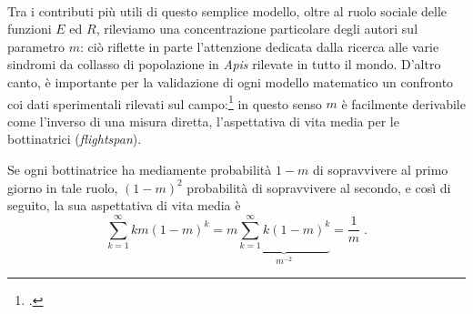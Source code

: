 \paragraph{}
\label{par:mInverseFlightspan}
Tra i contributi più utili di questo semplice modello, oltre al ruolo sociale delle funzioni $E$ ed
$R$, rileviamo una concentrazione particolare degli autori sul parametro $m$:
ciò riflette in parte l'attenzione dedicata dalla ricerca alle varie sindromi da
collasso di popolazione in \emph{Apis} rilevate in tutto il mondo.
D'altro canto, è importante per la validazione di ogni modello matematico
un confronto coi dati sperimentali rilevati sul campo:\footcite{rueppell2009honey}
in questo senso $m$ è facilmente derivabile come l'inverso
di una misura diretta, l'aspettativa di vita media per le bottinatrici (\emph{flightspan}).

Se ogni bottinatrice ha mediamente probabilità $1-m$ di sopravvivere al primo giorno in tale ruolo, $(1-m)^2$
probabilità di sopravvivere al secondo, e così di seguito, la sua aspettativa di vita media è
$$ \sum_{k=1}^{\infty} k m {(1-m)}^k = m \underbrace{ \sum_{k=1}^{\infty} k {(1-m)}^k }_{m^{-2}}
= \frac{1}{m} \; .$$


